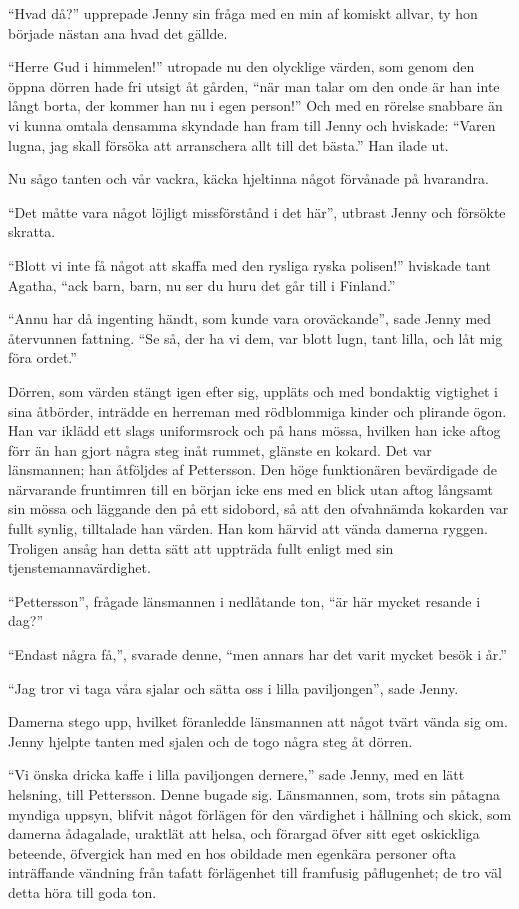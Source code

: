 ``Hvad då?'' upprepade Jenny sin fråga med en min af komiskt allvar, ty
hon började nästan ana hvad det gällde.

``Herre Gud i himmelen!'' utropade nu den olycklige värden, som genom
den öppna dörren hade fri utsigt åt gården, ``när man talar om den onde
är han inte långt borta, der kommer han nu i egen person!'' Och med en
rörelse snabbare än vi kunna omtala densamma skyndade han fram till
Jenny och hviskade: ``Varen lugna, jag skall försöka att arranschera
allt till det bästa.'' Han ilade ut.

Nu sågo tanten och vår vackra, käcka hjeltinna något förvånade på
hvarandra.

``Det måtte vara något löjligt missförstånd i det här'', utbrast Jenny
och försökte skratta.

``Blott vi inte få något att skaffa med den rysliga ryska polisen!''
hviskade tant Agatha, ``ack barn, barn, nu ser du huru det går till i
Finland.''

``Annu har då ingenting händt, som kunde vara oroväckande'', sade Jenny
med återvunnen fattning. ``Se så, der ha vi dem, var blott lugn, tant
lilla, och låt mig föra ordet.''

Dörren, som värden stängt igen efter sig, uppläts och med bondaktig
vigtighet i sina åtbörder, inträdde en herreman med rödblommiga kinder
och plirande ögon. Han var iklädd ett slags uniformsrock och på hans
mössa, hvilken han icke aftog förr än han gjort några steg inåt rummet,
glänste en kokard. Det var länsmannen; han åtföljdes af Pettersson. Den
höge funktionären bevärdigade de närvarande fruntimren till en början
icke ens med en blick utan aftog långsamt sin mössa och läggande den på
ett sidobord, så att den ofvahnämda kokarden var fullt synlig,
tilltalade han värden. Han kom härvid att vända damerna ryggen. Troligen
ansåg han detta sätt att uppträda fullt enligt med sin
tjenstemannavärdighet.

``Pettersson'', frågade länsmannen i nedlåtande ton, ``är här mycket
resande i dag?''

``Endast några få,'', svarade denne, ``men annars har det varit mycket
besök i år.''

``Jag tror vi taga våra sjalar och sätta oss i lilla paviljongen'', sade
Jenny.

Damerna stego upp, hvilket föranledde länsmannen att något tvärt vända
sig om. Jenny hjelpte tanten med sjalen och de togo några steg åt
dörren.

``Vi önska dricka kaffe i lilla paviljongen dernere,'' sade Jenny, med
en lätt helsning, till Pettersson. Denne bugade sig. Länsmannen, som,
trots sin påtagna myndiga uppsyn, blifvit något förlägen för den
värdighet i hållning och skick, som damerna ådagalade, uraktlät att
helsa, och förargad öfver sitt eget oskickliga beteende, öfvergick han
med en hos obildade men egenkära personer ofta inträffande vändning från
tafatt förlägenhet till framfusig påflugenhet; de tro väl detta höra
till goda ton.

